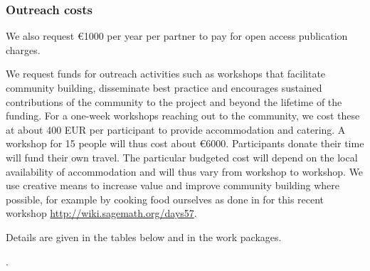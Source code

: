 \subsubsection{Outreach costs}
\label{sect:budget-outreach-publication-charges}
We also request \euro{1000} per year per partner to pay for open
access publication charges.

\label{sect:budget-outreach-workshops}
We request funds for outreach activities such as workshops that
facilitate community building, disseminate best practice and
encourages sustained contributions of the community to the project and
beyond the lifetime of the funding. For a one-week workshops reaching
out to the community, we cost these at about 400 EUR per participant
to provide accommodation and catering. A workshop for 15 people will
thus cost about \euro{6000}. Participants donate their time will fund
their own travel. The particular budgeted cost will depend on the
local availability of accommodation and will thus vary from workshop to
workshop. We use creative means to increase value and improve
community building where possible, for example by cooking food
ourselves as done in for this recent workshop
\href{http://wiki.sagemath.org/days57}{http://wiki.sagemath.org/days57}.

Details are given in the tables below and in the work packages.







.








